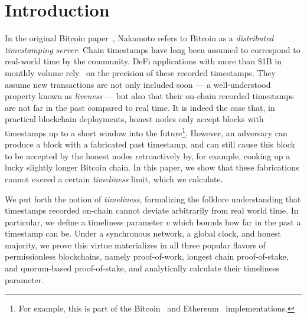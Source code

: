 \section{Introduction}
In the original Bitcoin paper~\cite{bitcoin}, Nakamoto refers to
Bitcoin as a \emph{distributed timestamping server}.
Chain timestamps have long been assumed to correspond to real-world time by the community.
DeFi applications with more than \$1B in monthly volume
rely~\cite{0x-timestamp} on the precision of these recorded timestamps.
They assume new transactions are not only
included soon --- a well-understood property known as \emph{liveness} ---
but also that their on-chain recorded timestamps are not far in the past compared to real time.
It is indeed the case that, in practical blockchain deployments, honest nodes only accept
blocks with timestamps up to a short window into the future\footnote{
  For example, this is part of the Bitcoin~\cite{bitcoin-code-future-blocks}
  and Ethereum~\cite{geth-future-blocks} implementations.
}.
However, an adversary can produce a block with a fabricated past timestamp,
and can still cause this block to be accepted by the honest nodes retroactively by, for example, cooking
up a lucky slightly longer Bitcoin chain. In this paper, we show that these fabrications
cannot exceed a certain \emph{timeliness} limit, which we calculate.


We put forth the notion of \emph{timeliness}, formalizing the folklore
understanding that timestamps recorded on-chain cannot deviate arbitrarily
from real world time. In particular, we define a timeliness parameter $v$ which bounds
how far in the past a timestamp can be. Under a synchronous network, a global clock, and honest majority, we prove this virtue materializes in all three popular flavors of
permissionless blockchains, namely proof-of-work,
longest chain proof-of-stake, and quorum-based proof-of-stake, and analytically
calculate their timeliness parameter.

